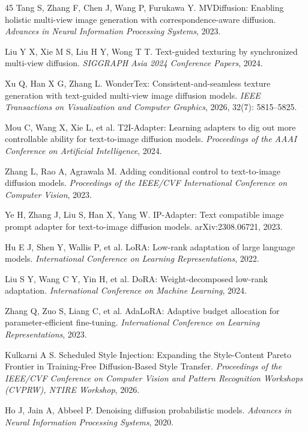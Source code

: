 \documentclass[times,twocolumn,final]{elsarticle}
\providecommand{\DIFadd}[1]{{\protect\color{blue} \sf #1}} %
\providecommand{\DIFaddbegin}{} %
\providecommand{\DIFaddend}{} %
\begin{document}
\begin{thebibliography}{45}
\DIFaddbegin {}
\DIFadd{Tang S, Zhang F, Chen J, Wang P, Furukawa Y. MVDiffusion: Enabling holistic multi-view image generation with correspondence-aware diffusion. \textit{Advances in Neural Information Processing Systems}, 2023.
}

\DIFaddend {}
Liu Y X, Xie M S, Liu H Y, Wong T T. Text-guided texturing by synchronized multi-view diffusion. \textit{SIGGRAPH Asia 2024 Conference Papers}, 2024.

Xu Q, Han X G, Zhang L. WonderTex: Consistent-and-seamless texture generation with text-guided multi-view image diffusion models. \textit{IEEE Transactions on Visualization and Computer Graphics}, 2026, 32(7): 5815--5825.

Mou C, Wang X, Xie L, et al. T2I-Adapter: Learning adapters to dig out more controllable ability for text-to-image diffusion models. \textit{Proceedings of the AAAI Conference on Artificial Intelligence}, 2024.

Zhang L, Rao A, Agrawala M. Adding conditional control to text-to-image diffusion models. \textit{Proceedings of the IEEE/CVF International Conference on Computer Vision}, 2023.

Ye H, Zhang J, Liu S, Han X, Yang W. IP-Adapter: Text compatible image prompt adapter for text-to-image diffusion models. arXiv:2308.06721, 2023.

Hu E J, Shen Y, Wallis P, et al. LoRA: Low-rank adaptation of large language models. \textit{International Conference on Learning Representations}, 2022.

Liu S Y, Wang C Y, Yin H, et al. DoRA: Weight-decomposed low-rank adaptation. \textit{International Conference on Machine Learning}, 2024.

Zhang Q, Zuo S, Liang C, et al. AdaLoRA: Adaptive budget allocation for parameter-efficient fine-tuning. \textit{International Conference on Learning Representations}, 2023.

\DIFaddbegin {}
\DIFadd{Kulkarni A S. Scheduled Style Injection: Expanding the Style-Content Pareto Frontier in Training-Free Diffusion-Based Style Transfer. \textit{Proceedings of the IEEE/CVF Conference on Computer Vision and Pattern Recognition Workshops (CVPRW), NTIRE Workshop}, 2026.
}

\DIFaddend {}
Ho J, Jain A, Abbeel P. Denoising diffusion probabilistic models. \textit{Advances in Neural Information Processing Systems}, 2020.


\end{thebibliography}
\end{document}
